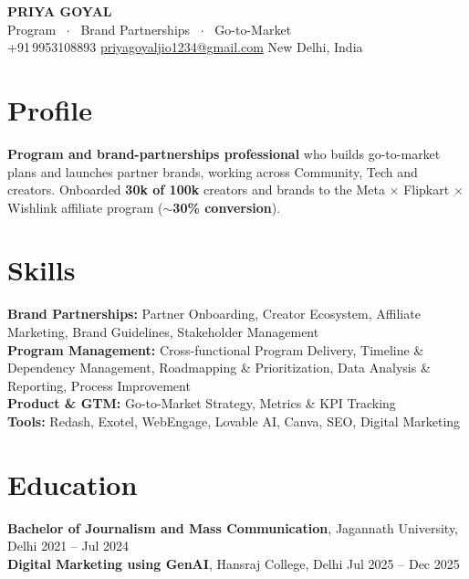 \documentclass[10pt,a4paper]{article}
\begin{document}

\begin{center}
  {\LARGE\bfseries\color{accent} PRIYA GOYAL}\\[4pt]
  {\small\textcolor{midgrey}{Program \ $\cdot$ \ Brand Partnerships \ $\cdot$ \ Go-to-Market}}\\[3pt]
  {\small
    +91\,9953108893 \quad
    \href{mailto:priyagoyaljio1234@gmail.com}{priyagoyaljio1234@gmail.com} \quad
    New Delhi, India
  }
\end{center}

\vspace{2pt}

\section{Profile}
\textbf{Program and brand-partnerships professional} who builds go-to-market plans and launches partner brands, working across Community, Tech and creators. Onboarded \textbf{30k of 100k} creators and brands to the Meta $\times$ Flipkart $\times$ Wishlink affiliate program (\textbf{$\sim$30\% conversion}).

\section{Skills}
\textbf{Brand Partnerships:} Partner Onboarding, Creator Ecosystem, Affiliate Marketing, Brand Guidelines, Stakeholder Management\\[1pt]
\textbf{Program Management:} Cross-functional Program Delivery, Timeline \& Dependency Management, Roadmapping \& Prioritization, Data Analysis \& Reporting, Process Improvement\\[1pt]
\textbf{Product \& GTM:} Go-to-Market Strategy, Metrics \& KPI Tracking\\[1pt]
\textbf{Tools:} Redash, Exotel, WebEngage, Lovable AI, Canva, SEO, Digital Marketing

\section{Education}
\textbf{Bachelor of Journalism and Mass Communication},
Jagannath University, Delhi \hfill 2021 -- Jul 2024\\
\textbf{Digital Marketing using GenAI},
Hansraj College, Delhi \hfill Jul 2025 -- Dec 2025
\end{document}
